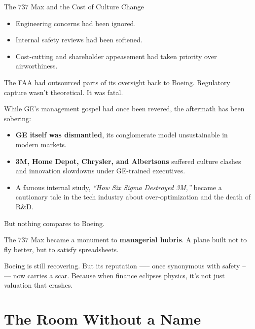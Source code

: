 \begin{HistoricalSidebar}{The 737 Max and the Cost of Culture Change}
  \medskip

  \begin{itemize}
    \item Engineering concerns had been ignored.
    \item Internal safety reviews had been softened.
    \item Cost-cutting and shareholder appeasement had taken priority over airworthiness.
  \end{itemize}

  \medskip
  
  The FAA had outsourced parts of its oversight back to Boeing.  
  Regulatory capture wasn’t theoretical. It was fatal.
  
  \medskip
  
  While GE’s management gospel had once been revered, the aftermath has been sobering:
  
  \medskip

  \begin{itemize}
    \item \textbf{GE itself was dismantled}, its conglomerate model unsustainable in modern markets.
    \item \textbf{3M, Home Depot, Chrysler, and Albertsons} suffered culture clashes and innovation slowdowns under 
    GE-trained executives.
    \item A famous internal study, \textit{“How Six Sigma Destroyed 3M,”} became a cautionary tale in the tech 
    industry about over-optimization and the death of R\&D.
  \end{itemize}

  \medskip
  
  But nothing compares to Boeing.
  
  \medskip
  
  The 737 Max became a monument to \textbf{managerial hubris}.  
  A plane built not to fly better, but to satisfy spreadsheets.
  
  \medskip
  
  Boeing is still recovering. But its reputation —-- once synonymous with safety --— now carries a scar.  
  Because when finance eclipses physics, it’s not just valuation that crashes.
  
\end{HistoricalSidebar}









\section{The Room Without a Name}

